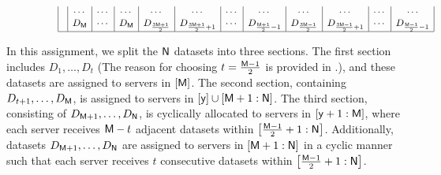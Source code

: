 \documentclass[conference,letterpaper]{IEEEtran}
\begin{document}
\begin{figure}
\begin{align*}
\begin{array}{rl|c|c|c|c|c|c|c|c|c|c|c|c|}
&& &\cdots &  \cdots       & \cdots & \cdots & \cdots   & \cdots & \cdots & \cdots & \cdots   & \cdots & \cdots \\
&& &D_{\Msf} &   \cdots  &  D_{\Msf} & D_{\frac{3\Msf+1}{2}} & D_{\frac{3\Msf+1}{2} +1}  & \cdots & D_{\frac{\Msf+1}{2}-1} &  D_{\frac{3\Msf-1}{2}}  &  D_{\frac{3\Msf-1}{2}+1}   &  \cdots  &  D_{\frac{\Msf-1}{2}-1}\\  
\cline{3-3}\cline{4-4}\cline{5-5}\cline{6-6}\cline{7-7}\cline{8-8}\cline{9-9}\cline{10-10}\cline{11-11}\cline{12-12}\cline{13-13}\cline{14-14}
\end{array} 
\end{align*}
\end{figure}
In this assignment, we split the ${\sf N}$ datasets into three sections. The first section includes $D_1, \ldots, D_t$ (The reason for choosing $t = \frac{{\sf M} - 1}{2}$ is provided in \cite{wan2022secure}.), and these datasets are assigned to servers in $[{\sf M}]$. The second section, containing $D_{t+1}, \ldots, D_{{\sf M}}$, is assigned to servers in $[{\sf y}] \cup [{\sf M}+1 : {\sf N}]$. The third section, consisting of $D_{{\sf M}+1}, \ldots, D_{{\sf N}}$, is cyclically allocated to servers in $[{\sf y}+1 : {\sf M}]$, where each server receives ${\sf M} - t$ adjacent datasets within $\left[{\frac{{\sf M} - 1}{2} + 1} : {\sf N} \right]$. Additionally, datasets $D_{{\sf M}+1}, \ldots, D_{{\sf N}}$ are assigned to servers in $[{\sf M}+1 : {\sf N}]$ in a cyclic manner such that each server receives $t$ consecutive datasets within $\left[{\frac{{\sf M} - 1}{2} + 1} : {\sf N} \right]$.
\end{document}
